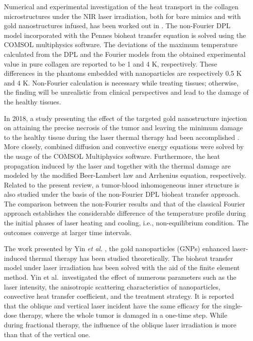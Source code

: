 \documentclass[sn-mathphys]{sn-jnl}%
\theoremstyle{thmstyleone}%
\theoremstyle{thmstyletwo}%
\theoremstyle{thmstylethree}%
\begin{document}
{Numerical and experimental investigation of the heat transport in the collagen microstructures under the NIR laser irradiation, both for bare mimics and with gold nanostructures infused, has been worked out in \cite{Sahoo2018}. The non-Fourier DPL model incorporated with the Pennes bioheat transfer equation is solved using the COMSOL multiphysics software. The deviations of the maximum temperature calculated from the DPL and the Fourier models from the obtained experimental value in pure collagen are reported to be 1 and 4 K, respectively. These differences in the phantoms embedded with nanoparticles are respectively 0.5 K and 4 K. Non-Fourier calculation is necessary while treating tissues; otherwise, the finding will be unrealistic from clinical perspectives and lead to the damage of the healthy tissues.

In 2018, a study presenting the effect of the targeted gold nanostructure injection on attaining the precise necrosis of the tumor and leaving the minimum damage to the healthy tissue during the laser thermal therapy had been accomplished \cite{Paul2018}. More closely, combined diffusion and convective energy equations were solved by the usage of the COMSOL Multiphysics software. Furthermore, the heat propagation induced by the laser and together with the thermal damage are modeled by the modified Beer-Lambert law and Arrhenius equation, respectively. Related to the present review, a tumor-blood inhomogeneous inner structure is also studied under the basis of the non-Fourier DPL bioheat transfer approach. The comparison between the non-Fourier results and that of the classical Fourier approach establishes the considerable difference of the temperature profile during the initial phases of laser heating and cooling, i.e., non-equilibrium condition. The outcomes converge at larger time intervals.

The work presented by Yin \emph{et al.} \cite{Yin2020}, the gold nanoparticles (GNPs) enhanced laser-induced thermal therapy has been studied theoretically. The bioheat transfer model under laser irradiation has been solved with the aid of the finite element method. Yin et al.~investigated the effect of numerous parameters such as the laser intensity, the anisotropic scattering characteristics of nanoparticles, convective heat transfer coefficient, and the treatment strategy. It is reported that the oblique and vertical laser incident have the same efficacy for the single-dose therapy, where the whole tumor is damaged in a one-time step. While during fractional therapy, the influence of the oblique laser irradiation is more than that of the vertical one.

}
\end{document}
